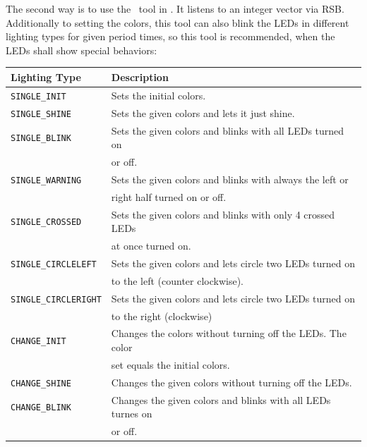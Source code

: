 \bigskip

The second way is to use the \setlightsnameI\ tool in \setlightspathI. It listens to an integer vector via RSB. Additionally to setting the colors, this tool can also blink the LEDs in different lighting types for given period times, so this tool is recommended, when the LEDs shall show special behaviors:

\medskip

\begin{tabular}{l|l}
{\bf Lighting Type} & {\bf Description} \\
\hline
{\tt SINGLE\_INIT}        & Sets the initial colors. \\
\hline
{\tt SINGLE\_SHINE}       & Sets the given colors and lets it just shine. \\
\hline
{\tt SINGLE\_BLINK}       & Sets the given colors and blinks with all LEDs turned on \\
                          & or off. \\
\hline
{\tt SINGLE\_WARNING}     & Sets the given colors and blinks with always the left or \\
                          & right half turned on or off. \\
\hline
{\tt SINGLE\_CROSSED}     & Sets the given colors and blinks with only 4 crossed LEDs \\
                          & at once turned on. \\
\hline
{\tt SINGLE\_CIRCLELEFT}  & Sets the given colors and lets circle two LEDs turned on \\
                          & to the left (counter clockwise). \\
\hline
{\tt SINGLE\_CIRCLERIGHT} & Sets the given colors and lets circle two LEDs turned on \\
                          & to the right (clockwise) \\
\hline
{\tt CHANGE\_INIT}        & Changes the colors without turning off the LEDs. The color \\
                          & set equals the initial colors. \\
\hline
{\tt CHANGE\_SHINE}       & Changes the given colors without turning off the LEDs. \\
\hline
{\tt CHANGE\_BLINK}       & Changes the given colors and blinks with all LEDs turnes on \\
                          & or off. \\
\end{tabular}


